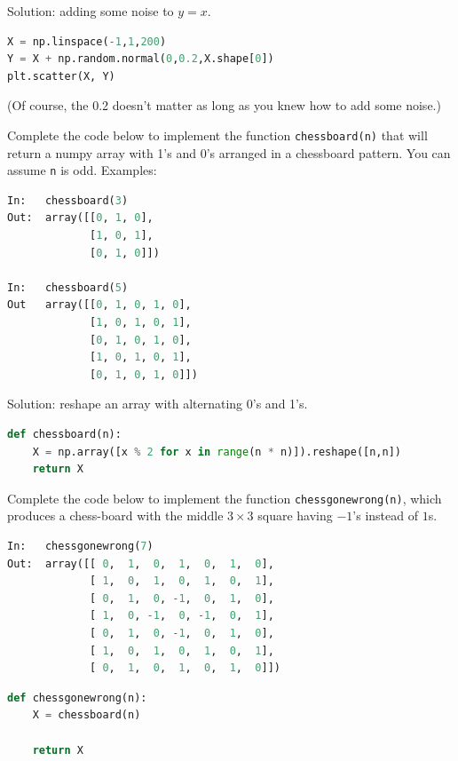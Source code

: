 \documentclass[addpoints,12pt]{exam}
\newcommand{\code}[1]{{\texttt{#1}}}
\begin{document}
\begin{questions}
\begin{enumerate}
\vspace{0.2in}

Solution: adding some noise to $y=x$.
\begin{lstlisting}[language=python]
X = np.linspace(-1,1,200)
Y = X + np.random.normal(0,0.2,X.shape[0])
plt.scatter(X, Y)
\end{lstlisting}
(Of course, the 0.2 doesn't matter as long as you knew how to add some noise.)


\vfill
\end{enumerate}


\newpage
\question[20] Complete the code below to implement the function \code{chessboard(n)} that will return a numpy array with 1's and 0's arranged in a chessboard pattern. You can assume \code{n} is odd. 
Examples:
\begin{lstlisting}[language=python]
In:   chessboard(3)
Out:  array([[0, 1, 0],
             [1, 0, 1],
             [0, 1, 0]])

In:   chessboard(5)
Out   array([[0, 1, 0, 1, 0],
             [1, 0, 1, 0, 1],
             [0, 1, 0, 1, 0],
             [1, 0, 1, 0, 1],
             [0, 1, 0, 1, 0]])
\end{lstlisting}

\vspace{0.2in}
Solution: reshape an array with alternating 0's and 1's. 
\begin{lstlisting}[language=python]
def chessboard(n):
    X = np.array([x % 2 for x in range(n * n)]).reshape([n,n])
    return X
\end{lstlisting}
\vfill

Complete the code below to implement the function \code{chessgonewrong(n)}, which produces a chess-board with the middle $3\times 3$ square having $-1$'s instead of $1$s.
\begin{lstlisting}[language=python]
In:   chessgonewrong(7) 
Out:  array([[ 0,  1,  0,  1,  0,  1,  0],
             [ 1,  0,  1,  0,  1,  0,  1],
             [ 0,  1,  0, -1,  0,  1,  0],
             [ 1,  0, -1,  0, -1,  0,  1],
             [ 0,  1,  0, -1,  0,  1,  0],
             [ 1,  0,  1,  0,  1,  0,  1],
             [ 0,  1,  0,  1,  0,  1,  0]])
\end{lstlisting}

\begin{lstlisting}[language=python]
def chessgonewrong(n):
    X = chessboard(n)

    return X
\end{lstlisting}


\end{questions}
\end{document}
